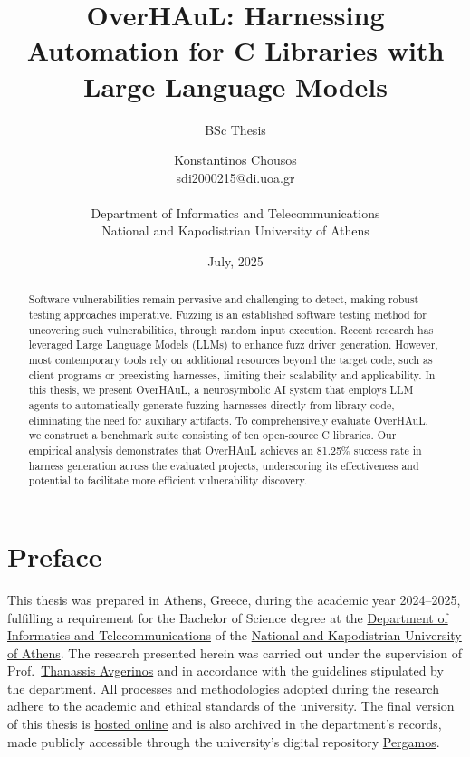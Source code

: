 \documentclass[
  a4paper,
]{scrreprt}
\title{OverHAuL: Harnessing Automation for C Libraries with Large
Language Models}
\subtitle{BSc Thesis}
\author{
	Konstantinos Chousos \orcidlink{0009-0008-6063-7915}
	\\\medskip sdi2000215@di.uoa.gr%
	\\\medskip
	\\\medskip
	Department of Informatics and Telecommunications
	\\\medskip
	National and Kapodistrian University of Athens
}
\date{July, 2025}
\theoremstyle{definition}
\theoremstyle{remark}
\begin{document}
\maketitle
\begin{abstract}
Software vulnerabilities remain pervasive and challenging to detect,
making robust testing approaches imperative. Fuzzing is an established
software testing method for uncovering such vulnerabilities, through
random input execution. Recent research has leveraged Large Language
Models (LLMs) to enhance fuzz driver generation. However, most
contemporary tools rely on additional resources beyond the target code,
such as client programs or preexisting harnesses, limiting their
scalability and applicability. In this thesis, we present OverHAuL, a
neurosymbolic AI system that employs LLM agents to automatically
generate fuzzing harnesses directly from library code, eliminating the
need for auxiliary artifacts. To comprehensively evaluate OverHAuL, we
construct a benchmark suite consisting of ten open-source C libraries.
Our empirical analysis demonstrates that OverHAuL achieves an 81.25\%
success rate in harness generation across the evaluated projects,
underscoring its effectiveness and potential to facilitate more
efficient vulnerability discovery.
\end{abstract}





\chapter*{Preface}\label{preface}


This thesis was prepared in Athens, Greece, during the academic year
2024--2025, fulfilling a requirement for the Bachelor of Science degree
at the \href{https://www.di.uoa.gr/en}{Department of Informatics and
Telecommunications} of the \href{https://en.uoa.gr/}{National and
Kapodistrian University of Athens}. The research presented herein was
carried out under the supervision of
Prof.~\href{https://cgi.di.uoa.gr/~thanassis/}{Thanassis Avgerinos} and
in accordance with the guidelines stipulated by the department. All
processes and methodologies adopted during the research adhere to the
academic and ethical standards of the university. The final version of
this thesis is \href{https://kchousos.github.io/BSc-Thesis/}{hosted
online} and is also archived in the department's records, made publicly
accessible through the university's digital repository
\href{https://pergamos.lib.uoa.gr/}{Pergamos}.
\end{document}
